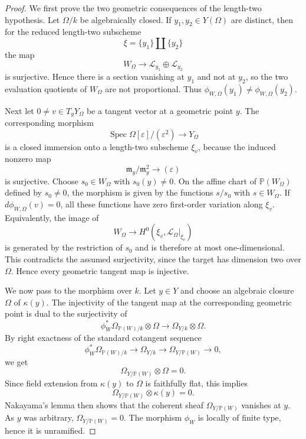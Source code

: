 \documentclass{lms}
\DeclareMathOperator{\Spec}{Spec}
\newcommand{\PP}{\mathbb P}
\newcommand{\kk}{\kappa}
\begin{document}
\begin{proof}
We first prove the two geometric consequences of the length-two hypothesis.  Let $\Omega/k$ be algebraically closed.  If $y_1,y_2\in Y(\Omega)$ are distinct, then for the reduced length-two subscheme
\[
        \xi=\{y_1\}\amalg\{y_2\}
\]
the map
\[
        W_\Omega\to \mathcal L_{y_1}\oplus\mathcal L_{y_2}
\]
is surjective.  Hence there is a section vanishing at $y_1$ and not at $y_2$, so the two evaluation quotients of $W_\Omega$ are not proportional.  Thus $\phi_{W,\Omega}(y_1)\ne\phi_{W,\Omega}(y_2)$.

Next let $0\ne v\in T_yY_\Omega$ be a tangent vector at a geometric point $y$.  The corresponding morphism
\[
        \Spec \Omega[\varepsilon]/(\varepsilon^2)\longrightarrow Y_\Omega
\]
is a closed immersion onto a length-two subscheme $\xi_v$, because the induced nonzero map
\[
        \mathfrak m_y/\mathfrak m_y^2\longrightarrow (\varepsilon)
\]
is surjective.  Choose $s_0\in W_\Omega$ with $s_0(y)\ne0$.  On the affine chart of $\PP(W_\Omega)$ defined by $s_0\ne0$, the morphism is given by the functions $s/s_0$ with $s\in W_\Omega$.  If $d\phi_{W,\Omega}(v)=0$, all these functions have zero first-order variation along $\xi_v$.  Equivalently, the image of
\[
        W_\Omega\to H^0(\xi_v,\mathcal L_\Omega|_{\xi_v})
\]
is generated by the restriction of $s_0$ and is therefore at most one-dimensional.  This contradicts the assumed surjectivity, since the target has dimension two over $\Omega$.  Hence every geometric tangent map is injective.

We now pass to the morphism over $k$.  Let $y\in Y$ and choose an algebraic closure $\Omega$ of $\kk(y)$.  The injectivity of the tangent map at the corresponding geometric point is dual to the surjectivity of
\[
        \phi_W^*\Omega_{\PP(W)/k}\otimes\Omega
        \longrightarrow
        \Omega_{Y/k}\otimes\Omega .
\]
By right exactness of the standard cotangent sequence
\[
        \phi_W^*\Omega_{\PP(W)/k}
        \longrightarrow
        \Omega_{Y/k}
        \longrightarrow
        \Omega_{Y/\PP(W)}
        \longrightarrow0,
\]
we get
\[
        \Omega_{Y/\PP(W)}\otimes\Omega=0.
\]
Since field extension from $\kk(y)$ to $\Omega$ is faithfully flat, this implies
\[
        \Omega_{Y/\PP(W)}\otimes\kk(y)=0.
\]
Nakayama's lemma then shows that the coherent sheaf $\Omega_{Y/\PP(W)}$ vanishes at $y$.  As $y$ was arbitrary, $\Omega_{Y/\PP(W)}=0$.  The morphism $\phi_W$ is locally of finite type, hence it is unramified.


\end{proof}
\end{document}
